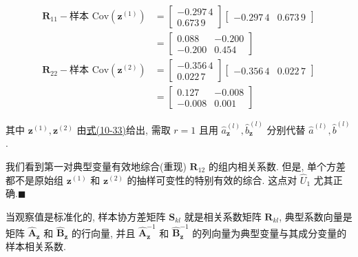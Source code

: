 
\[
\begin{aligned}
\mathbf{R}_{11}-\text{样本 }\mathrm{Cov}(\mathbf{z}^{(1)})&=\begin{bmatrix}-0.297\,4\\0.673\,9\end{bmatrix}\begin{bmatrix}-0.297\,4&0.673\,9\end{bmatrix}\\
&=\begin{bmatrix}0.088&-0.200\\-0.200&0.454\end{bmatrix}
\end{aligned}
\]
\[
\begin{aligned}
\mathbf{R}_{22}-\text{样本 }\mathrm{Cov}(\mathbf{z}^{(2)})&=\begin{bmatrix}-0.356\,4\\0.022\,7\end{bmatrix}\begin{bmatrix}-0.356\,4&0.022\,7\end{bmatrix}\\
&=\begin{bmatrix}0.127&-0.008\\-0.008&0.001\end{bmatrix}
\end{aligned}
\]

其中 $\mathbf{z}^{(1)},\mathbf{z}^{(2)}$ 由\hyperref[eq:10-33]{式(10-33)}给出, 需取 $r=1$ 且用 $\hat{a}_{\mathbf{z}}^{(l)},\hat{b}_{\mathbf{z}}^{(l)}$ 分别代替 $\hat{a}^{(l)},\hat{b}^{(l)}$.

我们看到第一对典型变量有效地综合(重现) $\mathbf{R}_{12}$ 的组内相关系数. 但是, 单个方差都不是原始组 $\mathbf{z}^{(1)}$ 和 $\mathbf{z}^{(2)}$ 的抽样可变性的特别有效的综合. 这点对 $\hat{U}_1$ 尤其正确.\hfill$\blacksquare$


当观察值是标准化的, 样本协方差矩阵 $\mathbf{S}_{kl}$ 就是相关系数矩阵 $\mathbf{R}_{kl}$, 典型系数向量是矩阵 $\hat{\mathbf{A}}_{\mathbf{z}}$ 和 $\hat{\mathbf{B}}_{\mathbf{z}}$ 的行向量, 并且 $\hat{\mathbf{A}}_{\mathbf{z}}^{-1}$ 和 $\hat{\mathbf{B}}_{\mathbf{z}}^{-1}$ 的列向量为典型变量与其成分变量的样本相关系数.


